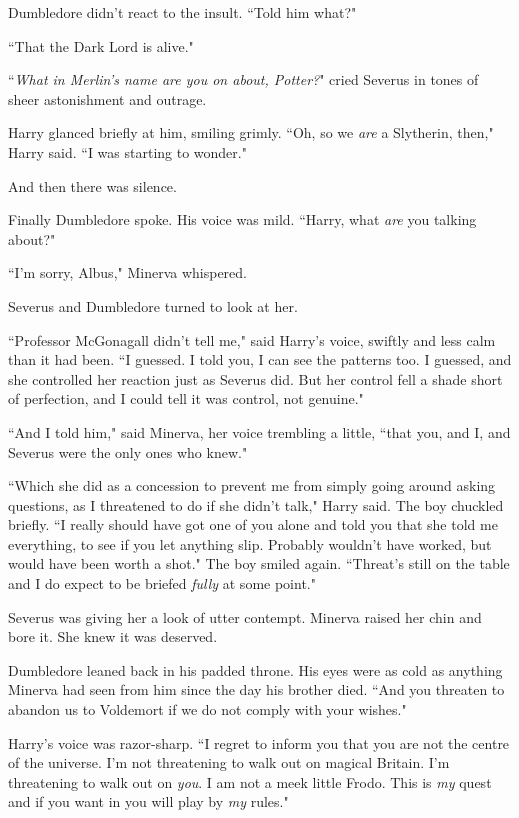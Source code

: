 Dumbledore didn't react to the insult. ``Told him what?"

``That the Dark Lord is alive."

``\emph{What in Merlin's name are you on about, Potter?}" cried Severus in tones of sheer astonishment and outrage.

Harry glanced briefly at him, smiling grimly. ``Oh, so we \emph{are} a Slytherin, then," Harry said. ``I was starting to wonder."

And then there was silence.

Finally Dumbledore spoke. His voice was mild. ``Harry, what \emph{are} you talking about?"

``I'm sorry, Albus," Minerva whispered.

Severus and Dumbledore turned to look at her.

``Professor McGonagall didn't tell me," said Harry's voice, swiftly and less calm than it had been. ``I guessed. I told you, I can see the patterns too. I guessed, and she controlled her reaction just as Severus did. But her control fell a shade short of perfection, and I could tell it was control, not genuine."

``And I told him," said Minerva, her voice trembling a little, ``that you, and I, and Severus were the only ones who knew."

``Which she did as a concession to prevent me from simply going around asking questions, as I threatened to do if she didn't talk," Harry said. The boy chuckled briefly. ``I really should have got one of you alone and told you that she told me everything, to see if you let anything slip. Probably wouldn't have worked, but would have been worth a shot." The boy smiled again. ``Threat's still on the table and I do expect to be briefed \emph{fully} at some point."

Severus was giving her a look of utter contempt. Minerva raised her chin and bore it. She knew it was deserved.

Dumbledore leaned back in his padded throne. His eyes were as cold as anything Minerva had seen from him since the day his brother died. ``And you threaten to abandon us to Voldemort if we do not comply with your wishes."

Harry's voice was razor-sharp. ``I regret to inform you that you are not the centre of the universe. I'm not threatening to walk out on magical Britain. I'm threatening to walk out on \emph{you}. I am not a meek little Frodo. This is \emph{my} quest and if you want in you will play by \emph{my} rules."

